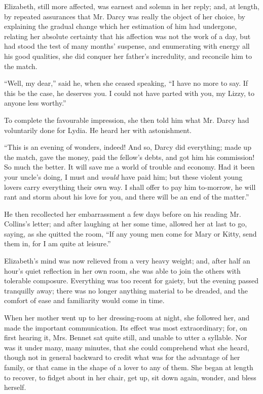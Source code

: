 \documentclass[12pt]{book}
\begin{document}
Elizabeth, still more affected, was earnest and solemn in her reply; and, at length, by repeated assurances that Mr. Darcy was really the object of her choice, by explaining the gradual change which her estimation of him had undergone, relating her absolute certainty that his affection was not the work of a day, but had stood the test of many months' suspense, and enumerating with energy all his good qualities, she did conquer her father's incredulity, and reconcile him to the match.

``Well, my dear,'' said he, when she ceased speaking, ``I have no more to say. If this be the case, he deserves you. I could not have parted with you, my Lizzy, to anyone less worthy.''

To complete the favourable impression, she then told him what Mr. Darcy had voluntarily done for Lydia. He heard her with astonishment.

``This is an evening of wonders, indeed! And so, Darcy did everything; made up the match, gave the money, paid the fellow's debts, and got him his commission! So much the better. It will save me a world of trouble and economy. Had it been your uncle's doing, I must and \textit{would} have paid him; but these violent young lovers carry everything their own way. I shall offer to pay him to-morrow, he will rant and storm about his love for you, and there will be an end of the matter.''

He then recollected her embarrassment a few days before on his reading Mr. Collins's letter; and after laughing at her some time, allowed her at last to go, saying, as she quitted the room, ``If any young men come for Mary or Kitty, send them in, for I am quite at leisure.''

Elizabeth's mind was now relieved from a very heavy weight; and, after half an hour's quiet reflection in her own room, she was able to join the others with tolerable composure. Everything was too recent for gaiety, but the evening passed tranquilly away; there was no longer anything material to be dreaded, and the comfort of ease and familiarity would come in time.

When her mother went up to her dressing-room at night, she followed her, and made the important communication. Its effect was most extraordinary; for, on first hearing it, Mrs. Bennet sat quite still, and unable to utter a syllable. Nor was it under many, many minutes, that she could comprehend what she heard, though not in general backward to credit what was for the advantage of her family, or that came in the shape of a lover to any of them. She began at length to recover, to fidget about in her chair, get up, sit down again, wonder, and bless herself.
\end{document}
